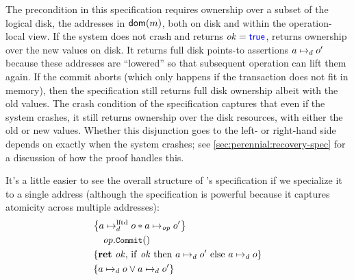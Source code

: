 The precondition in this specification requires ownership over a subset of the
logical disk, the addresses in $\textsf{\upshape dom}(m)$, both on disk and within the
operation-local view. If the system does not crash and returns
$\mathit{ok} = \mathsf{\textcolor{blue}{true}}$,  returns ownership over the new values
on disk. It returns full disk points-to assertions $a \mapsto_d o'$ because
these addresses are ``lowered'' so that subsequent operation can lift them
again. If the commit aborts (which only happens if the transaction does not fit
in memory), then the specification still returns full disk ownership albeit with
the old values. The crash condition of the  specification captures
that even if the system crashes, it still returns ownership over the disk
resources, with either the old or new values. Whether this disjunction goes to
the left- or right-hand side depends on exactly when the system crashes; see
\cref{sec:perennial:recovery-spec} for a discussion of how the proof handles
this.

It's a little easier to see the overall structure of 's specification
if we specialize it to a single address (although the specification is powerful
because it captures atomicity across multiple addresses):
\begin{align*}
  \hoareCV{a \mapstoLftd o \sep a \mapstoOp o'} %
  {\mathit{op}.\cc{Commit}()}%
  {\Ret{\mathit{ok}} \mathrm{if~} \mathit{ok} %
  \mathrm{~then~} a \mapstoDisk o' \mathrm{~else~} a \mapstoDisk o}%
  {a \mapstoDisk o \lor a \mapstoDisk o'}
\end{align*}
